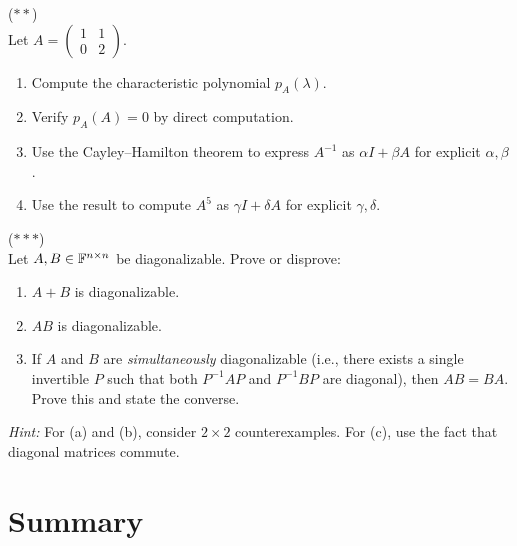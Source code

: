 \documentclass[11pt,a4paper]{article}
\begin{document}
\begin{exercise}
\label{exer:cayley_hamilton}
\textnormal{(\(**\))} \\
Let $A = \begin{pmatrix} 1 & 1 \\ 0 & 2 \end{pmatrix}$.
\begin{enumerate}[nosep,label=(\alph*)]
  \item Compute the characteristic polynomial $p_A(\lambda)$.
  \item Verify $p_A(A) = 0$ by direct computation.
  \item Use the Cayley--Hamilton theorem to express $A^{-1}$ as
        $\alpha I + \beta A$ for explicit $\alpha, \beta$.
  \item Use the result to compute $A^5$ as $\gamma I + \delta A$
        for explicit $\gamma, \delta$.
\end{enumerate}
\end{exercise}

\begin{exercise}
\label{exer:diag_proof}
\textnormal{(\(***\))} \\
Let $A, B \in \mathbb{F}^{n \times n}$ be diagonalizable.  Prove or disprove:
\begin{enumerate}[nosep,label=(\alph*)]
  \item $A + B$ is diagonalizable.
  \item $AB$ is diagonalizable.
  \item If $A$ and $B$ are \emph{simultaneously} diagonalizable (i.e.,
        there exists a single invertible $P$ such that both $P^{-1}AP$ and
        $P^{-1}BP$ are diagonal), then $AB = BA$.  Prove this and state the
        converse.
\end{enumerate}
\textit{Hint:} For (a) and (b), consider $2 \times 2$ counterexamples.
For (c), use the fact that diagonal matrices commute.
\end{exercise}

\section{Summary}
\label{sec:summary}
\end{document}
